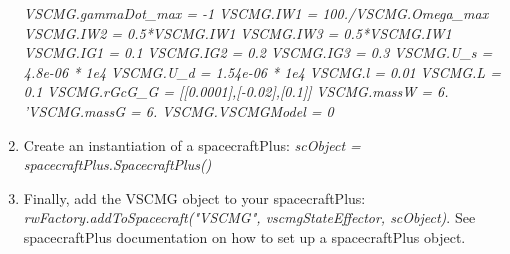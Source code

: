 \begin{enumerate}
         \textit{VSCMG.gammaDot\_max = -1} \newline
         \textit{VSCMG.IW1 = 100./VSCMG.Omega\_max} \newline
         \textit{VSCMG.IW2 = 0.5*VSCMG.IW1} \newline
         \textit{VSCMG.IW3 = 0.5*VSCMG.IW1} \newline
         \textit{VSCMG.IG1 = 0.1} \newline
         \textit{VSCMG.IG2 = 0.2} \newline
         \textit{VSCMG.IG3 = 0.3} \newline
         \textit{VSCMG.U\_s = 4.8e-06 * 1e4} \newline
         \textit{VSCMG.U\_d = 1.54e-06 * 1e4} \newline
         \textit{VSCMG.l = 0.01} \newline
         \textit{VSCMG.L = 0.1} \newline
         \textit{VSCMG.rGcG\_G = [[0.0001],[-0.02],[0.1]]} \newline
         \textit{VSCMG.massW = 6.} \newline
         \textit{'VSCMG.massG = 6.} \newline
         \textit{VSCMG.VSCMGModel = 0} 
	\item Create an instantiation of a spacecraftPlus: \newline
	\textit{scObject = spacecraftPlus.SpacecraftPlus()}
	\item Finally, add the VSCMG object to your spacecraftPlus:\newline
	\textit{rwFactory.addToSpacecraft("VSCMG", vscmgStateEffector, scObject)}. See spacecraftPlus documentation on how to set up a spacecraftPlus object.
\end{enumerate}
